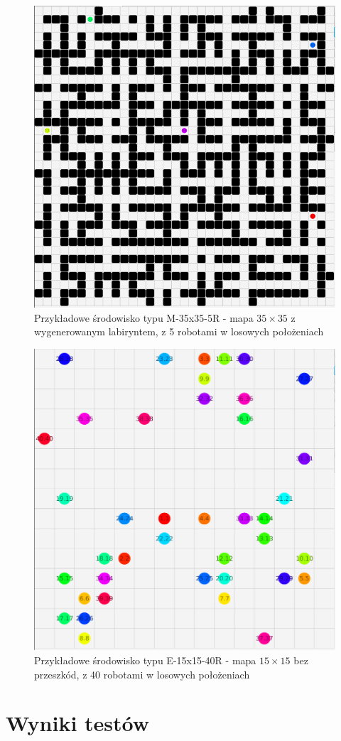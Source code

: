 \begin{figure}
	\centering
	\includegraphics[width=0.6\columnwidth]{img/robopath/tests-35-35-5}
	\caption{Przykładowe środowisko typu M-35x35-5R - mapa $35 \times 35$ z wygenerowanym labiryntem, z 5 robotami w losowych położeniach}
	\label{fig:test-env-35-35-5}
\end{figure}

\begin{figure}
	\centering
	\includegraphics[width=0.6\columnwidth]{img/robopath/tests-15-15-empty-40}
	\caption{Przykładowe środowisko typu E-15x15-40R - mapa $15 \times 15$ bez przeszkód, z 40 robotami w losowych położeniach}
	\label{fig:test-env-15-15-empty-40}
\end{figure}

\section{Wyniki testów}
